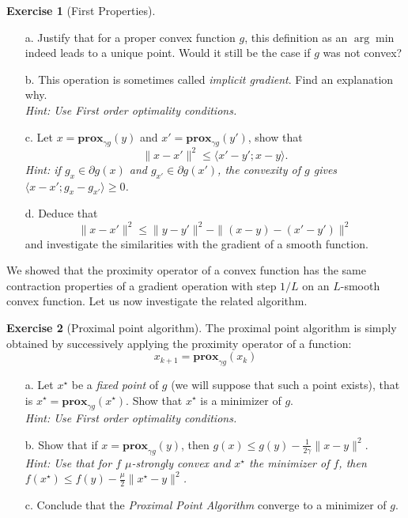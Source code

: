 \documentclass[a4paper,twoside,10pt]{amsart}
\numberwithin{equation}{section} %
\numberwithin{figure}{section} %
\numberwithin{table}{section} %
\theoremstyle{definition}
\newtheorem{q_td}{Exercise }
\begin{document}
\begin{q_td}[First Properties]\label{td:prox0}\hfill

\begin{itemize}
\item[a.] Justify that for a proper convex function $g$, this definition as an $\arg\min$ indeed leads to a unique point. Would it still be the case if $g$ was not convex?
\item[b.] This operation is sometimes called \emph{implicit gradient}. Find an explanation why.\\
\emph{\small Hint: Use First order optimality conditions.}
\item[c.] Let $x = \mathbf{prox}_{\gamma g}(y)$ and $x' = \mathbf{prox}_{\gamma g}(y')$, show that 
$$ \|x - x'\|^2 \leq \langle x' - y ' ; x- y \rangle . $$ 
\emph{\small Hint: if $g_{x} \in \partial g(x)$ and $g_{x'} \in \partial g(x')$, the convexity of $g$ gives $\langle x -x'; g_x - g_{x'} \rangle \geq 0$.}
\item[d.] Deduce that 
$$ \|x - x'\|^2 \leq \| y - y' \|^2 -  \| (x-y) - (x'-y') \|^2 $$ 
and investigate the similarities with the gradient of a smooth function.
\end{itemize}
\end{q_td}

\vspace*{0.5cm}

We showed that the proximity operator of a convex function has the same contraction properties of a gradient operation with step $1/L$ on an $L$-smooth convex function. Let us now investigate the related algorithm.

\vspace*{0.5cm}

\begin{q_td}[Proximal point algorithm]\label{td:prox} The proximal point algorithm is simply obtained by successively applying the proximity operator of a function:
$$x_{k+1} = \mathbf{prox}_{\gamma g}(x_k)$$
\begin{itemize}
\item[a.] Let $x^\star$ be a \emph{fixed point} of $g$ (we will suppose that such a point exists), that is  $x^\star =  \mathbf{prox}_{\gamma g}(x^\star)$. Show that $x^\star$ is a minimizer of $g$. \\
\emph{\small Hint: Use First order optimality conditions.}
\item[b.] Show that if $x = \mathbf{prox}_{\gamma g}(y)  $, then $g(x)\leq g(y) - \frac{1}{2\gamma} \|x-y\|^2$.\\
\emph{\small Hint: Use that for $f$ $\mu$-strongly convex and $x^\star$ the minimizer of $f$, then $f(x^\star) \leq f(y) - \frac{\mu}{2}\|x^\star-y\|^2$.}
\item[c.] Conclude that the \emph{Proximal Point Algorithm}  converge to a minimizer of $g$.
\end{itemize}
\end{q_td}
\end{document}
